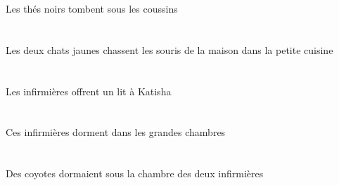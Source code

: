 \begin{exe}
Les thés noirs tombent sous les coussins
\ex\glll
\DEFDuErg{}   \jauneDDu{}   \chatDDuErg{}    \DEFSgObl{}   \petitCSg{}   \cuisineCSgObl{}   \DANS{}   \DEFPlAbs{}    \DEFSgObl{}   \maisonDSgObl{}   \DE{}   \sourisAPlAbs{}  \chasserVtPrsAPl{}\\
\DEFDuErgP{}   \jauneDDuP{}   \chatDDuErgP{}    \DEFSgOblP{}   \petitCSgP{}   \cuisineCSgOblP{}   \DANSP{}   \DEFPlAbsP{}    \DEFSgOblP{}   \maisonDSgOblP{}   \DEP{}   \sourisAPlAbsP{}  \chasserVtPrsAPlP{}\\
\DEFDuErgG{}   \jauneDDuG{}   \chatDDuErgG{}    \DEFSgOblG{}   \petitCSgG{}   \cuisineCSgOblG{}   \DANSG{}   \DEFPlAbsG{}    \DEFSgOblG{}   \maisonDSgOblG{}   \DEG{}   \sourisAPlAbsG{}  \chasserVtPrsAPlG{}\\
Les deux chats jaunes chassent les souris de la maison dans la petite cuisine
\ex\glll
\DEFPlErg{}   \infirmiereBPlErg{}    \INDSgDat{}   \KatishaASgDat{}   \INDSgAbs{}   \litDSgAbs{}  \offrirVdPrsDSg{}\\
\DEFPlErgP{}   \infirmiereBPlErgP{}    \INDSgDatP{}   \KatishaASgDatP{}   \INDSgAbsP{}   \litDSgAbsP{}  \offrirVdPrsDSgP{}\\
\DEFPlErgG{}   \infirmiereBPlErgG{}    \INDSgDatG{}   \KatishaASgDatG{}   \INDSgAbsG{}   \litDSgAbsG{}  \offrirVdPrsDSgG{}\\
Les infirmières offrent un lit à Katisha
\ex\glll
\DEMPlAbs{}   \infirmiereBPlAbs{}    \DEFPlObl{}   \grandBPl{}   \chambreBPlObl{}   \DANS{}  \dormirViPrsBPl{}\\
\DEMPlAbsP{}   \infirmiereBPlAbsP{}    \DEFPlOblP{}   \grandBPlP{}   \chambreBPlOblP{}   \DANSP{}  \dormirViPrsBPlP{}\\
\DEMPlAbsG{}   \infirmiereBPlAbsG{}    \DEFPlOblG{}   \grandBPlG{}   \chambreBPlOblG{}   \DANSG{}  \dormirViPrsBPlG{}\\
Ces infirmières dorment dans les grandes chambres
\ex\glll
\DEFSgObl{}    \DEFDuObl{}   \infirmiereBDuObl{}   \DE{}   \chambreBSgObl{}   \SOUS{}   \INDPlAbs{}   \coyoteAPlAbs{}  \dormirViPstAPl{}\\
\DEFSgOblP{}    \DEFDuOblP{}   \infirmiereBDuOblP{}   \DEP{}   \chambreBSgOblP{}   \SOUSP{}   \INDPlAbsP{}   \coyoteAPlAbsP{}  \dormirViPstAPlP{}\\
\DEFSgOblG{}    \DEFDuOblG{}   \infirmiereBDuOblG{}   \DEG{}   \chambreBSgOblG{}   \SOUSG{}   \INDPlAbsG{}   \coyoteAPlAbsG{}  \dormirViPstAPlG{}\\
Des coyotes dormaient sous la chambre des deux infirmières
\ex\glll
\INDSgErg{}   \KatishaASgErg{}    \DEMDuDat{}   \filleCDuDat{}   \DEMPlAbs{}   \troisDPl{}   \chatDPlAbs{}  \donnerVdPrsDPl{}\\

\end{exe}
